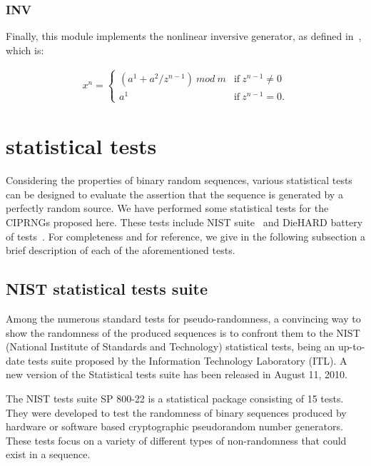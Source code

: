 \subsubsection{INV}
Finally, this module implements the nonlinear inversive generator, as defined in~\cite{Lecuyer2009}, which is:

\begin{equation}
\label{INV}
\begin{array}{l}
x^n=\left\{
\begin{array}{ll}
(a^1 + a^2 / z^{n-1})~mod~m & \text{if}~ z^{n-1} \neq 0 \\
a^1 & \text{if}~  z^{n-1} = 0 .\end{array} \right. \end{array}\end{equation}


\section{statistical tests}
\label{Security analysis}

Considering the properties of binary random sequences, various statistical tests can be designed to evaluate the assertion that the sequence is generated by a perfectly random source. We have performed some statistical tests for the CIPRNGs proposed here. These tests include NIST suite~\cite{ANDREW2008} and DieHARD battery of tests~\cite{Marsaglia1996}. For completeness and for reference, we give in the following subsection a brief description of each of the aforementioned tests.

\subsection{NIST statistical tests suite}

Among the numerous standard tests for pseudo-randomness, a convincing way to show the randomness of the produced sequences is to confront them to the NIST (National Institute of  Standards and Technology) statistical tests, being an up-to-date tests suite proposed by the Information Technology Laboratory (ITL). A new version of the Statistical tests suite has been released in August 11, 2010.

The NIST tests suite SP 800-22 is a statistical package consisting of 15 tests. They were developed to test the randomness of binary sequences produced by hardware or software based cryptographic pseudorandom number generators. These tests focus on a variety of different types of non-randomness that could exist in a sequence.

